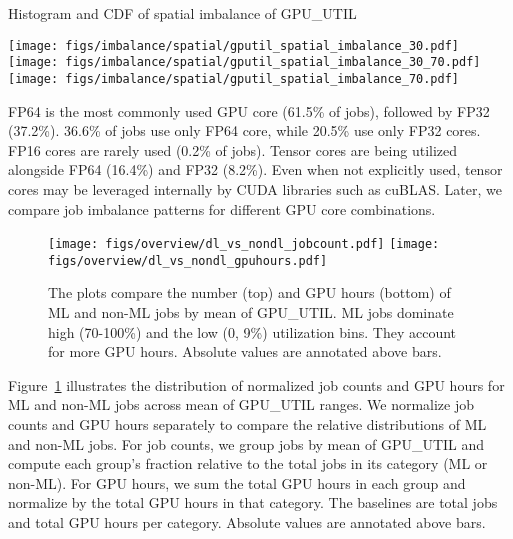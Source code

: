 \begin{figure*}[t]
    \centering
    Histogram and CDF of spatial imbalance of GPU\_UTIL \par\medskip
    \vspace{-0.05in}
    \texttt{[image: figs/imbalance/spatial/gputil\_spatial\_imbalance\_30.pdf]}
    \texttt{[image: figs/imbalance/spatial/gputil\_spatial\_imbalance\_30\_70.pdf]}
    \texttt{[image: figs/imbalance/spatial/gputil\_spatial\_imbalance\_70.pdf]}
    \caption{The plots show the distribution of spatial imbalance of GPU\_UTIL
        for jobs grouped by mean of GPU\_UTIL ranges
        (0-30\%, 31-69\%, 70-100\%, left to right). Low-utilization jobs exhibit the
        highest spatial imbalance. 97.6\% of high-utilization have below 0.5 imbalance.}
    \label{fig:gputil_spatial}
\end{figure*}

FP64 is the most commonly used GPU core (61.5\% of jobs), followed
by FP32 (37.2\%). 36.6\% of jobs use only FP64 core, while 20.5\% use only FP32
cores. FP16 cores are rarely used (0.2\% of jobs). Tensor cores are being
utilized alongside FP64 (16.4\%) and FP32 (8.2\%). Even when not
explicitly used, tensor cores may be leveraged internally by CUDA libraries
such as cuBLAS. Later,  we compare job imbalance patterns for different GPU core
combinations.

\begin{figure}[h]
    \centering
    \texttt{[image: figs/overview/dl\_vs\_nondl\_jobcount.pdf]}
    \texttt{[image: figs/overview/dl\_vs\_nondl\_gpuhours.pdf]}
    \caption{The plots compare the number (top) and GPU hours (bottom) of ML and
        non-ML jobs by mean of GPU\_UTIL. ML jobs dominate high (70-100\%)
        and the low (0, 9\%) utilization bins. They account for more
        GPU hours. Absolute values are annotated above bars.}
    \label{fig:dl_related}
\end{figure}

Figure~\ref{fig:dl_related} illustrates the distribution of
normalized job counts and GPU hours for ML and non-ML jobs across
mean of GPU\_UTIL ranges. We normalize job counts and GPU hours separately to
compare the relative distributions of ML and non-ML jobs.
For job counts, we group jobs by mean of GPU\_UTIL and compute each group's
fraction relative to the total jobs in its category (ML or non-ML).
For GPU hours, we sum the total GPU hours in each group and normalize by the
total GPU hours in that category. The baselines are total jobs and total GPU
hours per category. Absolute values are annotated above bars.

